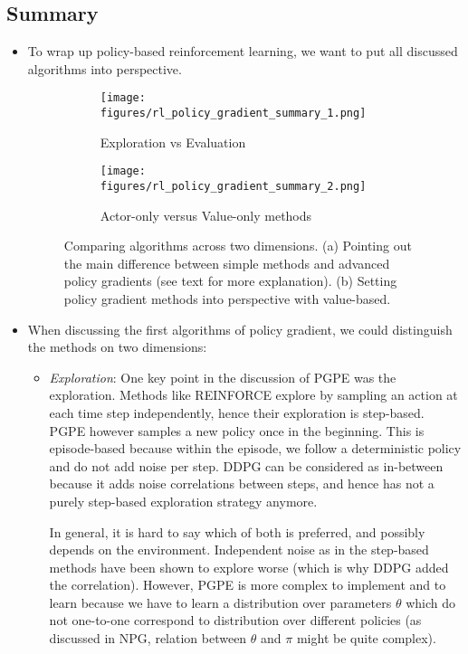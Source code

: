 \subsection{Summary}
\begin{itemize}
	\item To wrap up policy-based reinforcement learning, we want to put all discussed algorithms into perspective.
	
	\begin{figure}[ht!]
		\centering
		\begin{subfigure}{0.45\textwidth}
			\centering
			\texttt{[image: figures/rl\_policy\_gradient\_summary\_1.png]}
			\caption{Exploration vs Evaluation}
		\end{subfigure}
		\hspace{5mm}
		\begin{subfigure}{0.45\textwidth}
			\centering
			\texttt{[image: figures/rl\_policy\_gradient\_summary\_2.png]}
			\caption{Actor-only versus Value-only methods}
		\end{subfigure}
		\caption{Comparing algorithms across two dimensions. (a) Pointing out the main difference between simple methods and advanced policy gradients (see text for more explanation). (b) Setting policy gradient methods into perspective with value-based.}
	\end{figure}

	\item When discussing the first algorithms of policy gradient, we could distinguish the methods on two dimensions:
	\begin{itemize}
		\item \textit{Exploration}: One key point in the discussion of PGPE was the exploration. Methods like REINFORCE explore by sampling an action at each time step independently, hence their exploration is step-based. PGPE however samples a new policy once in the beginning. This is episode-based because within the episode, we follow a deterministic policy and do not add noise per step. DDPG can be considered as in-between because it adds noise correlations between steps, and hence has not a purely step-based exploration strategy anymore. 
		
		In general, it is hard to say which of both is preferred, and possibly depends on the environment. Independent noise as in the step-based methods have been shown to explore worse (which is why DDPG added the correlation). However, PGPE is more complex to implement and to learn because we have to learn a distribution over parameters $\theta$ which do not one-to-one correspond to distribution over different policies (as discussed in NPG, relation between $\theta$ and $\pi$ might be quite complex).
		

\end{itemize}
\end{itemize}
